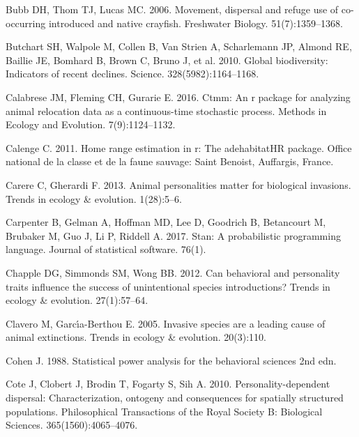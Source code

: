 \documentclass[
]{article}
\begin{document}
\leavevmode\hypertarget{ref-bubb2006movement}{}%
Bubb DH, Thom TJ, Lucas MC. 2006. Movement, dispersal and refuge use of
co-occurring introduced and native crayfish. Freshwater Biology.
51(7):1359--1368.

\leavevmode\hypertarget{ref-butchart2010global}{}%
Butchart SH, Walpole M, Collen B, Van Strien A, Scharlemann JP, Almond
RE, Baillie JE, Bomhard B, Brown C, Bruno J, et al. 2010. Global
biodiversity: Indicators of recent declines. Science.
328(5982):1164--1168.

\leavevmode\hypertarget{ref-calabrese2016ctmm}{}%
Calabrese JM, Fleming CH, Gurarie E. 2016. Ctmm: An r package for
analyzing animal relocation data as a continuous-time stochastic
process. Methods in Ecology and Evolution. 7(9):1124--1132.

\leavevmode\hypertarget{ref-calenge2011home}{}%
Calenge C. 2011. Home range estimation in r: The adehabitatHR package.
Office national de la classe et de la faune sauvage: Saint Benoist,
Auffargis, France.

\leavevmode\hypertarget{ref-carere2013animal}{}%
Carere C, Gherardi F. 2013. Animal personalities matter for biological
invasions. Trends in ecology \& evolution. 1(28):5--6.

\leavevmode\hypertarget{ref-carpenter2017stan}{}%
Carpenter B, Gelman A, Hoffman MD, Lee D, Goodrich B, Betancourt M,
Brubaker M, Guo J, Li P, Riddell A. 2017. Stan: A probabilistic
programming language. Journal of statistical software. 76(1).

\leavevmode\hypertarget{ref-chapple2012can}{}%
Chapple DG, Simmonds SM, Wong BB. 2012. Can behavioral and personality
traits influence the success of unintentional species introductions?
Trends in ecology \& evolution. 27(1):57--64.

\leavevmode\hypertarget{ref-clavero2005invasive}{}%
Clavero M, Garcı́a-Berthou E. 2005. Invasive species are a leading cause
of animal extinctions. Trends in ecology \& evolution. 20(3):110.

\leavevmode\hypertarget{ref-cohen1988statistical}{}%
Cohen J. 1988. Statistical power analysis for the behavioral sciences
2nd edn.

\leavevmode\hypertarget{ref-cote2010personality}{}%
Cote J, Clobert J, Brodin T, Fogarty S, Sih A. 2010.
Personality-dependent dispersal: Characterization, ontogeny and
consequences for spatially structured populations. Philosophical
Transactions of the Royal Society B: Biological Sciences.
365(1560):4065--4076.
\end{document}
